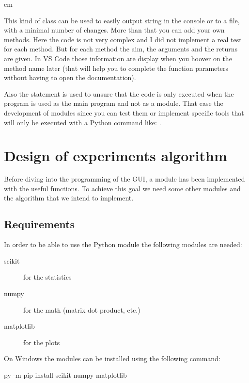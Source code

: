 \documentclass[english, 12 pt, openany, oneside]{book}
\begin{document}
 cm

This kind of class can be used to easily output string in the console or to a file, with a minimal number of changes. More than that you can add your own methods. Here the code is not very complex and I did not implement a real test for each method. But for each method the aim, the arguments and the returns are given. In VS Code those information are display when you hoover on the method name later (that will help you to complete the function parameters without having to open the documentation).

Also the statement  is used to unsure that the code is only executed when the program is used as the main program and not as a module. That ease the development of modules since you can test them or implement specific tools that will only be executed with a Python command like: .
%


\section{Design of experiments algorithm}
Before diving into the programming of the GUI, a module has been implemented with the useful functions. To achieve this goal we need some other modules and the algorithm that we intend to implement.


\subsection{Requirements}
In order to be able to use the Python module the following modules are needed:

\begin{description}
\item[scikit] for the statistics
\item[numpy] for the math (matrix dot product, etc.)
\item[matplotlib] for the plots
\end{description}

On Windows the modules can be installed using the following command:
\begin{pyverbatim}
py -m pip install scikit numpy matplotlib
\end{pyverbatim}
\end{document}
